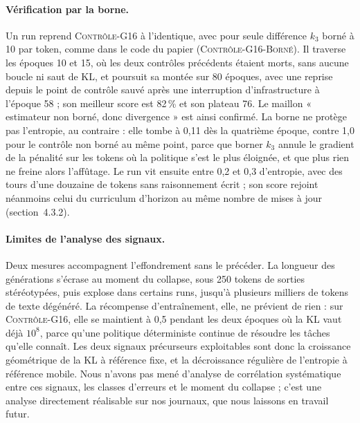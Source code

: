 \documentclass[11pt,a4paper]{article}
\begin{document}
\paragraph{Vérification par la borne.} Un run reprend \textsc{Contrôle-G16} à l'identique, avec pour seule différence $k_3$ borné à 10 par token, comme dans le code du papier (\textsc{Contrôle-G16-Borné}). Il traverse les époques 10 et 15, où les deux contrôles précédents étaient morts, sans aucune boucle ni saut de KL, et poursuit sa montée sur 80 époques, avec une reprise depuis le point de contrôle sauvé après une interruption d'infrastructure à l'époque 58 ; son meilleur score est 82\,\% et son plateau 76. Le maillon « estimateur non borné, donc divergence » est ainsi confirmé. La borne ne protège pas l'entropie, au contraire : elle tombe à 0{,}11 dès la quatrième époque, contre 1{,}0 pour le contrôle non borné au même point, parce que borner $k_3$ annule le gradient de la pénalité sur les tokens où la politique s'est le plus éloignée, et que plus rien ne freine alors l'affûtage. Le run vit ensuite entre 0{,}2 et 0{,}3 d'entropie, avec des tours d'une douzaine de tokens sans raisonnement écrit ; son score rejoint néanmoins celui du curriculum d'horizon au même nombre de mises à jour (section~4.3.2).

\paragraph{Limites de l'analyse des signaux.} Deux mesures accompagnent l'effondrement sans le précéder. La longueur des générations s'écrase au moment du collapse, sous 250 tokens de sorties stéréotypées, puis explose dans certains runs, jusqu'à plusieurs milliers de tokens de texte dégénéré. La récompense d'entraînement, elle, ne prévient de rien : sur \textsc{Contrôle-G16}, elle se maintient à 0{,}5 pendant les deux époques où la KL vaut déjà $10^{8}$, parce qu'une politique déterministe continue de résoudre les tâches qu'elle connaît. Les deux signaux précurseurs exploitables sont donc la croissance géométrique de la KL à référence fixe, et la décroissance régulière de l'entropie à référence mobile. Nous n'avons pas mené d'analyse de corrélation systématique entre ces signaux, les classes d'erreurs et le moment du collapse ; c'est une analyse directement réalisable sur nos journaux, que nous laissons en travail futur.
\end{document}
